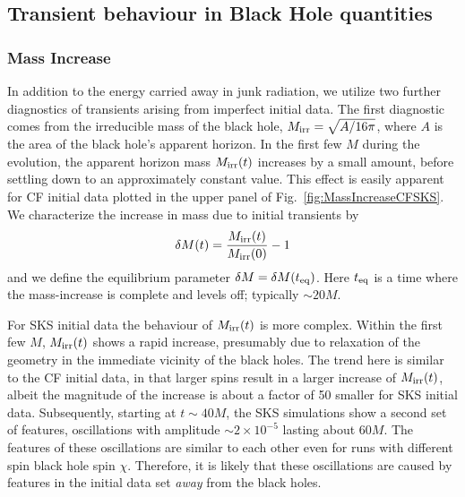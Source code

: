 \subsection{Transient behaviour in Black Hole quantities}

\subsubsection{Mass Increase}
In addition to the energy carried away in junk radiation, we utilize two further
diagnostics of transients arising from imperfect initial data.
The first diagnostic comes from the irreducible
mass of the black hole, $M_{\rm irr} = \sqrt{A/16\pi}$, where $A$
is the area of the black hole's apparent horizon. In the first few $M$ during the evolution, the apparent horizon mass
$M_{\rm irr}(t)$ increases by a small amount, before settling down to
an approximately constant value. This effect is easily apparent for CF initial data plotted in the upper panel of Fig.~\ref{fig:MassIncreaseCFSKS}.
We characterize the increase in mass due to initial transients by 
\begin{equation}
\delta M(t)=\frac{M_{\rm irr}(t)}{M_{\rm irr}(0)}-1
\end{equation}
and we define the equilibrium parameter $\delta M = \delta M(t_{\rm eq})$.
Here $t_{\rm eq}$ is a time where the mass-increase is complete and
levels off; typically $\sim20M$. 

For SKS initial data the behaviour of $M_{\rm irr}(t)$ is more
  complex.  Within the first few $M$, $M_{\rm irr}(t)$ shows a rapid
  increase, presumably due to relaxation of the geometry
  in the immediate vicinity of the black holes.  The trend here is
  similar to the CF initial data, in that larger spins result in a
  larger increase of $M_{\rm irr}(t)$, albeit the magnitude of the
  increase is about a factor of 50 smaller for SKS initial data.
  Subsequently, starting at $t\sim 40M$, the SKS simulations show a second
  set of features, oscillations with amplitude $\sim 2\times 10^{-5}$ lasting about
  $60M$.  The features of these oscillations are similar to each other
  even for runs with different spin black hole spin $\chi$.  Therefore, it is
  likely that these oscillations are caused by features in the initial
  data set {\it away} from the black holes.

